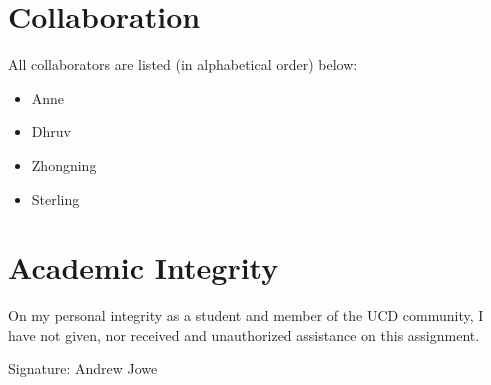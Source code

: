 \documentclass[17pt]{extarticle}
\begin{document}
\section*{Collaboration}
All collaborators are listed (in alphabetical order) below:
\begin{itemize}
    \item Anne
    \item Dhruv
    \item Zhongning
    \item Sterling
\end{itemize}

\section*{Academic Integrity}
On my personal integrity as a student and member of the UCD community, I have not given, nor received and unauthorized assistance on this assignment.

Signature: Andrew Jowe
\end{document}
